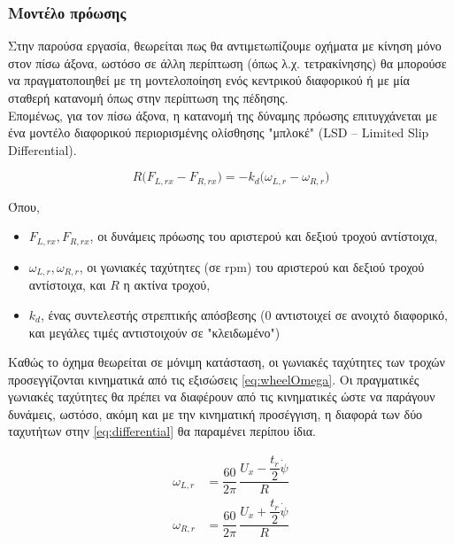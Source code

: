 \subsubsection{Μοντέλο πρόωσης}

Στην παρούσα εργασία, θεωρείται πως θα αντιμετωπίζουμε οχήματα με κίνηση μόνο στον πίσω άξονα, ωστόσο σε άλλη περίπτωση (όπως λ.χ. τετρακίνησης) θα μπορούσε να 
πραγματοποιηθεί με τη μοντελοποίηση ενός κεντρικού διαφορικού ή με μία σταθερή κατανομή όπως στην περίπτωση της πέδησης.\\[10pt]
\noindent
Επομένως, για τον πίσω άξονα, η κατανομή της δύναμης πρόωσης επιτυγχάνεται με ένα μοντέλο διαφορικού περιορισμένης ολίσθησης "μπλοκέ" (LSD -- Limited Slip Differential). 

\begin{equation}
    R\bigl(F_{L,rx} - F_{R,rx}\bigr) = -k_d\bigl(\omega_{L,r}-\omega_{R,r}\bigr)
    \label{eq:differential}
\end{equation}

Όπου,
\begin{itemize}
    \item $F_{L,rx}, F_{R,rx}$, οι δυνάμεις πρόωσης του αριστερού και δεξιού τροχού αντίστοιχα,
    \item $\omega_{L,r}, \omega_{R,r}$, οι γωνιακές ταχύτητες (σε rpm) του αριστερού και δεξιού τροχού αντίστοιχα, και $R$ η ακτίνα τροχού,
    \item $k_d$, ένας συντελεστής στρεπτικής απόσβεσης (0 αντιστοιχεί σε ανοιχτό διαφορικό, και μεγάλες τιμές αντιστοιχούν σε "κλειδωμένο")
\end{itemize}

Καθώς το όχημα θεωρείται σε μόνιμη κατάσταση, οι γωνιακές ταχύτητες των τροχών προσεγγίζονται κινηματικά από τις εξισώσεις \ref{eq:wheelOmega}. Οι πραγματικές γωνιακές ταχύτητες θα πρέπει να διαφέρουν από τις κινηματικές ώστε να παράγουν δυνάμεις,
ωστόσο, ακόμη και με την κινηματική προσέγγιση, η διαφορά των δύο ταχυτήτων στην \cref{eq:differential} θα παραμένει περίπου ίδια.

\begin{equation}
    \begin{aligned}
        \omega_{L,r} &= \dfrac{60}{2\pi}\,\dfrac{U_x - \dfrac{t_r}{2}\dot{\psi}}{R}\\[6pt]
        \omega_{R,r} &= \dfrac{60}{2\pi}\,\dfrac{U_x + \dfrac{t_r}{2}\dot{\psi}}{R}
    \end{aligned}
    \label{eq:wheelOmega}
\end{equation}

